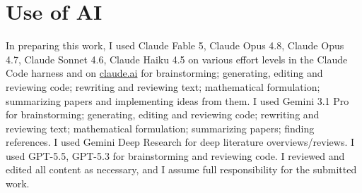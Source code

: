 \section*{Use of AI}
\label{sec:ai}

In preparing this work, I used Claude Fable 5, Claude Opus 4.8, Claude Opus 4.7, Claude Sonnet 4.6, Claude Haiku 4.5 on various effort levels in the Claude Code harness and on \url{claude.ai} for brainstorming; generating, editing and reviewing code; rewriting and reviewing text; mathematical formulation; summarizing papers and implementing ideas from them.
I used Gemini 3.1 Pro for brainstorming; generating, editing and reviewing code; rewriting and reviewing text; mathematical formulation; summarizing papers; finding references.
I used Gemini Deep Research for deep literature overviews/reviews.
I used GPT-5.5, GPT-5.3 for brainstorming and reviewing code.
I reviewed and edited all content as necessary, and I assume full responsibility for the submitted work.